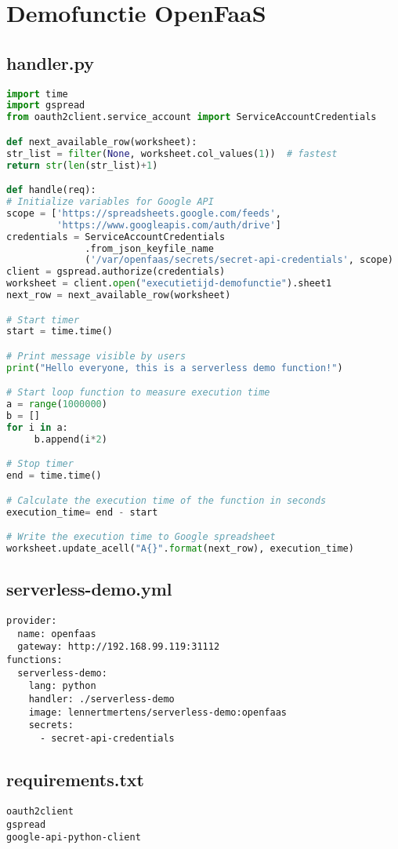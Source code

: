 \newpage
\section{Demofunctie OpenFaaS}
\subsection{handler.py}
\label{sec:demofunctie-openfaas}
\begin{lstlisting}[language=python]
import time
import gspread
from oauth2client.service_account import ServiceAccountCredentials

def next_available_row(worksheet):
str_list = filter(None, worksheet.col_values(1))  # fastest
return str(len(str_list)+1)

def handle(req):   
# Initialize variables for Google API
scope = ['https://spreadsheets.google.com/feeds',
         'https://www.googleapis.com/auth/drive']
credentials = ServiceAccountCredentials
              .from_json_keyfile_name
              ('/var/openfaas/secrets/secret-api-credentials', scope)
client = gspread.authorize(credentials)
worksheet = client.open("executietijd-demofunctie").sheet1
next_row = next_available_row(worksheet)

# Start timer 
start = time.time()

# Print message visible by users
print("Hello everyone, this is a serverless demo function!")

# Start loop function to measure execution time
a = range(1000000)
b = []
for i in a:
     b.append(i*2)

# Stop timer
end = time.time()

# Calculate the execution time of the function in seconds
execution_time= end - start

# Write the execution time to Google spreadsheet
worksheet.update_acell("A{}".format(next_row), execution_time)
\end{lstlisting}

\newpage
\subsection{serverless-demo.yml}
\label{sec:serverless-demo.yml}
\begin{lstlisting}
provider:
  name: openfaas
  gateway: http://192.168.99.119:31112
functions:
  serverless-demo:
    lang: python
    handler: ./serverless-demo
    image: lennertmertens/serverless-demo:openfaas
    secrets:
      - secret-api-credentials
\end{lstlisting}

\subsection{requirements.txt}
\label{sec:requirements.txt}
\begin{lstlisting}
oauth2client
gspread
google-api-python-client
\end{lstlisting}